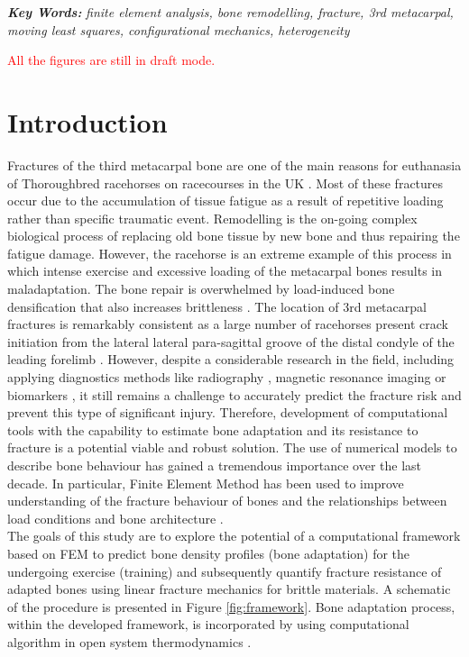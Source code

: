 \documentclass[11pt]{ACMEarticle}
\numberwithin{equation}{section}
\begin{document}
{\textbf{\textit{Key Words:}} {\it finite element analysis, bone remodelling, fracture, 3rd metacarpal, moving least squares, configurational mechanics, heterogeneity}}
%
\\
\newpage

\textcolor{red}{All the figures are still in draft mode.}
\section{Introduction}
Fractures of the third metacarpal bone are one of the main reasons for euthanasia of Thoroughbred racehorses on racecourses in the UK \citep{Parkin2004risk}.
Most of these fractures occur due to the accumulation of tissue fatigue as a result of repetitive loading \citep{Parkin2005} rather than specific traumatic event.
Remodelling is the on-going complex biological process of replacing old bone tissue by new bone and thus repairing the fatigue damage\citep{hughes2017role}.
However, the racehorse is an extreme example of this process in which intense exercise and excessive loading of the metacarpal bones results in maladaptation.
The bone repair is overwhelmed by load-induced bone densification that also increases brittleness \citep{loughridge2017qualitative}.
The location of 3rd metacarpal fractures is remarkably consistent as a large number of racehorses present crack initiation from 
the lateral lateral para-sagittal groove of the distal condyle of the leading forelimb \citep{jacklin2012frequency, parkin2006analysis}.
However, despite a considerable research in the field, including applying diagnostics methods like radiography 
\citep{bogers2016quantitative, crijns2014intramodality, loughridge2017qualitative}, magnetic resonance imaging 
\citep{tranquille2017MRI} or biomarkers \citep{mcilwraith2005use}, it still remains a challenge to accurately predict the fracture risk 
and prevent this type of significant injury.
Therefore, development of computational tools with the capability to estimate bone adaptation and its resistance to fracture is a potential 
viable and robust solution.
The use of numerical models to describe bone behaviour has gained a tremendous importance over the last decade. 
In particular, Finite Element Method has been used to improve understanding of the fracture behaviour of bones and the relationships between load conditions and bone architecture \citep{podshivalov2014road, poelert2013patient}. \\
The goals of this study are to explore the potential of a computational framework based on FEM to predict bone density profiles 
(bone adaptation) for the undergoing exercise (training) and subsequently quantify fracture resistance of 
adapted bones using linear fracture mechanics for brittle materials. 
A schematic of the procedure is presented in Figure \ref{fig:framework}.
Bone adaptation process, within the developed framework, is incorporated by using computational algorithm in open system thermodynamics 
\citep{Kuhl2003a}.
\end{document}

